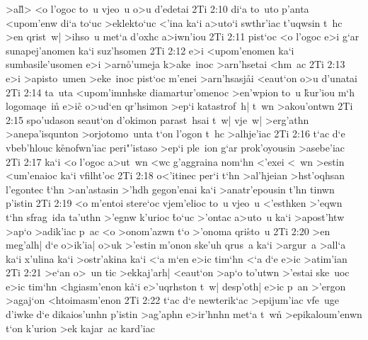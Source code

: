 >al\r{l}>
<o
l'ogoc
to~u
vjeo~u
o>u
d'edetai\bibvsend
\vs 2Ti 2:10
di`a
to~uto
p'anta
<upom'enw
di`a
to`uc
>eklekto`uc
<'ina
ka`i
a>uto`i
swthr'iac
t'uqwsin
t~hc
>en
qrist~w|
>ihso~u
met`a
d'oxhc
a>iwn'iou\bibvsend
\vs 2Ti 2:11
pist`oc
<o
l'ogoc
e>i
g`ar
sunapej'anomen
ka`i
suz'hsomen\bibvsend
\vs 2Ti 2:12
e>i
<upom'enomen
ka`i
sumbasile'usomen
e>i
>arn\r{o}'umeja
k>ake~inoc
>arn'hsetai
<hm~ac\bibvsend
\vs 2Ti 2:13
e>i
>apisto~umen
>eke~inoc
pist`oc
m'enei
>arn'hsasj\r{a}i
<eaut`on
o>u
d'unatai\bibvsend
\vs 2Ti 2:14
ta~uta
<upom'imnhske
diamartur'omenoc
>en'wpion
to~u
\r{k}ur'iou
m`h
logomaqe~i\r{n}
e>i\r{c}
o>ud`en
qr'hsimon
>ep`i
katastrof~h|
t~wn
>akou'ontwn\bibvsend
\vs 2Ti 2:15
spo'udason
seaut`on
d'okimon
parast~hsai
t~w|
vje~w|
>erg'athn
>anepa'isqunton
>orjotomo~unta
t`on
l'ogon
t~hc
>alhje'iac\bibvsend
\vs 2Ti 2:16
t`ac
d`e
vbeb'hlouc
k\r{e}nofwn'iac
peri"'istaso
>ep`i
ple~ion
g`ar
prok'oyousin
>asebe'iac\bibvsend
\vs 2Ti 2:17
ka`i
<o
l'ogoc
a>ut~wn
<wc
g'aggraina
nom`hn
<'exei
<~wn
>estin
<um'enaioc
ka`i
vfilht'oc\bibvsend
\vs 2Ti 2:18
o<'itinec
per`i
t`hn
>al'hjeian
>hst'oqhsan
l'egontec
\r{t}`hn
>an'astasin
>'hdh
gegon'enai
ka`i
>anatr'epousin
t'hn
tinwn
p'istin\bibvsend
\vs 2Ti 2:19
<o
m'entoi
stere`oc
vjem'elioc
to~u
vjeo~u
<'esthken
>'eqwn
t`hn
sfrag~ida
ta'uthn
>'egnw
k'urioc
\r{t}o`uc
>'ontac
a>uto~u
ka`i
>apost'htw
>ap`o
>adik'iac
p~ac
<o
>onom'azwn
t`o
>'onoma
qri\r{s}to~u\bibvsend
{}
\vs 2Ti 2:20
>en
meg'alh|
d`e
o>ik'ia|
o>uk
>'estin
m'onon
ske'uh
qrus~a
ka`i
>argur~a
>all`a
ka`i
x'ulina
ka`i
>ostr'akina
ka`i
<`a
m`en
e>ic
tim`hn
<`a
d`e
e>ic
>atim'ian\bibvsend
\vs 2Ti 2:21
>e`an
o>~un
tic
>ekkaj'arh|
<eaut`on
>ap`o
to'utwn
>'estai
ske~uoc
e>ic
tim`hn
<hgiasm'enon
k\r{a}`i
e>'uqrhston
t~w|
desp'oth|
e>ic
p~an
>'ergon
>agaj`on
<htoimasm'enon\bibvsend
\vs 2Ti 2:22
t`ac
d`e
newterik`ac
>epijum'iac
vfe~uge
d'iwke
d`e
dikaios'unhn
p'istin
>ag'aphn
e>ir'hnhn
met`a
t~wn\r{}
>epikaloum'enwn
t`on
k'urion
>ek
kajar~ac
kard'iac\bibvsend
